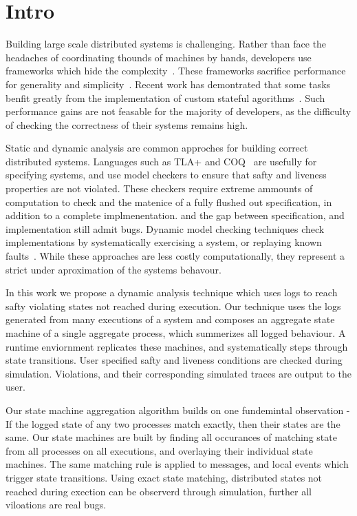 \section{Intro}
\label{sec:intro}

Building large scale distributed systems is challenging. Rather than face the
headaches of coordinating thounds of machines by hands, developers use
frameworks which hide the
complexity~\cite{Dean:2008:MSD:1327452.1327492,Zaharia:2012:RDD:2228298.2228301,Murray_naiad:a}.
These frameworks sacrifice performance for generality and
simplicity~\cite{McSherry:2015:SBC:2831090.2831104}. Recent work has
demontrated that some tasks benfit greatly from the implementation of custom
stateful agorithms~\cite{201559}. Such performance gains are not feasable for
the majority of developers, as the difficulty of checking the correctness of
their systems remains high.

Static and dynamic analysis are common approches for building correct
distributed systems. Languages such as TLA+ and
COQ~\cite{specifying-and-verifying-systems-with-tla,
Corbineau:2007:DLC:1786134.1786139} are usefully for specifying systems, and
use model checkers to ensure that safty and liveness properties are not
violated. These checkers require extreme ammounts of computation to check and
the matenice of a fully flushed out specification, in addition to a complete
implmenentation. and the gap between specification, and implementation still
admit bugs. Dynamic model checking techniques check implementations by
systematically exercising a system, or replaying known
faults~\cite{scottminimizing,yang_modist_nsdi09}. While these approaches are
less costly computationally, they represent a strict under aproximation of the
systems behavour.

In this work we propose a dynamic analysis technique which uses logs to reach
safty violating states not reached during execution. Our technique uses the
logs generated from many executions of a system and composes an aggregate state
machine of a single aggregate process, which summerizes all logged behaviour. A
runtime enviornment replicates these machines, and systematically steps through
state transitions. User specified safty and liveness conditions are checked
during simulation. Violations, and their corresponding simulated traces are
output to the user.

Our state machine aggregation algorithm builds on one fundemintal observation -
If the logged state of any two processes match exactly, then their states are
the same. Our state machines are built by finding all occurances of matching
state from all processes on all executions, and overlaying their individual
state machines. The same matching rule is applied to messages, and local events
which trigger state transitions. Using exact state matching, distributed states
not reached during exection can be observerd through simulation, further all
viloations are real bugs.


